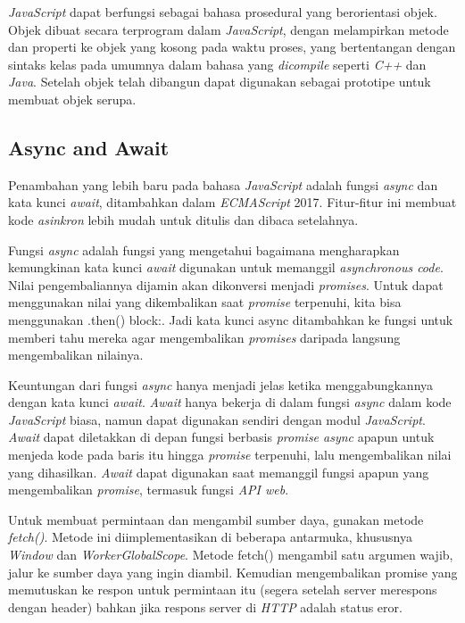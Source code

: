\textit{JavaScript} dapat berfungsi sebagai bahasa prosedural yang berorientasi objek. Objek dibuat secara terprogram dalam \textit{JavaScript}, dengan melampirkan metode dan properti ke objek yang kosong pada waktu proses, yang bertentangan dengan sintaks kelas pada umumnya dalam bahasa yang \textit{dicompile} seperti \textit{C++} dan \textit{Java}. Setelah objek telah dibangun dapat digunakan sebagai prototipe untuk membuat objek serupa. 

\subsection{Async and Await}
Penambahan yang lebih baru pada bahasa \textit{JavaScript} adalah fungsi \textit{async} dan kata kunci \textit{await}, ditambahkan dalam \textit{ECMAScript} 2017. Fitur-fitur ini membuat kode \textit{asinkron} lebih mudah untuk ditulis dan dibaca setelahnya. \cite{async}

Fungsi \textit{async} adalah fungsi yang mengetahui bagaimana mengharapkan kemungkinan kata kunci \textit{await} digunakan untuk memanggil \textit{asynchronous code}. Nilai pengembaliannya dijamin akan dikonversi menjadi \textit{promises}. Untuk dapat menggunakan nilai yang dikembalikan saat \textit{promise} terpenuhi, kita bisa menggunakan  .then() block:. Jadi kata kunci async ditambahkan ke fungsi untuk memberi tahu mereka agar mengembalikan \textit{promises} daripada langsung mengembalikan nilainya.

Keuntungan dari fungsi \textit{async} hanya menjadi jelas ketika menggabungkannya dengan kata kunci \textit{await}. \textit{Await} hanya bekerja di dalam fungsi \textit{async} dalam kode \textit{JavaScript} biasa, namun dapat digunakan sendiri dengan modul \textit{JavaScript}. \textit{Await} dapat diletakkan di depan fungsi berbasis \textit{promise async} apapun untuk menjeda kode pada baris itu hingga \textit{promise} terpenuhi, lalu mengembalikan nilai yang dihasilkan. \textit{Await} dapat digunakan saat memanggil fungsi apapun yang mengembalikan \textit{promise}, termasuk fungsi \textit{API web}.

Untuk membuat permintaan dan mengambil sumber daya, gunakan metode \textit{fetch()}. Metode ini diimplementasikan di beberapa antarmuka, khususnya \textit{Window} dan \textit{WorkerGlobalScope}. Metode fetch() mengambil satu argumen wajib, jalur ke sumber daya yang ingin diambil. Kemudian mengembalikan promise yang memutuskan ke respon untuk permintaan itu (segera setelah server merespons dengan header) bahkan jika respons server di \textit{HTTP} adalah status eror.





